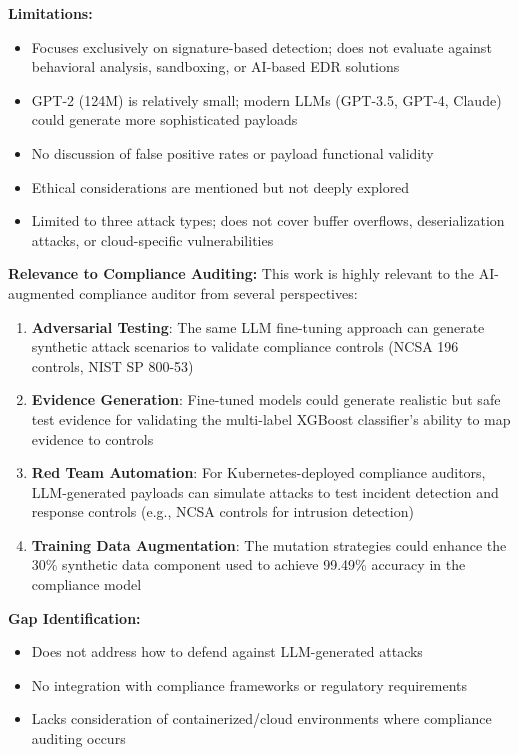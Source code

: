 \documentclass[11pt,conference]{IEEEtran}
\begin{document}
\textbf{Limitations:}
\begin{itemize}
    \item Focuses exclusively on signature-based detection; does not evaluate against behavioral analysis, sandboxing, or AI-based EDR solutions
    \item GPT-2 (124M) is relatively small; modern LLMs (GPT-3.5, GPT-4, Claude) could generate more sophisticated payloads
    \item No discussion of false positive rates or payload functional validity
    \item Ethical considerations are mentioned but not deeply explored
    \item Limited to three attack types; does not cover buffer overflows, deserialization attacks, or cloud-specific vulnerabilities
\end{itemize}

\textbf{Relevance to Compliance Auditing:}
This work is highly relevant to the AI-augmented compliance auditor from several perspectives:

\begin{enumerate}
    \item \textbf{Adversarial Testing}: The same LLM fine-tuning approach can generate synthetic attack scenarios to validate compliance controls (NCSA 196 controls, NIST SP 800-53)
    \item \textbf{Evidence Generation}: Fine-tuned models could generate realistic but safe test evidence for validating the multi-label XGBoost classifier's ability to map evidence to controls
    \item \textbf{Red Team Automation}: For Kubernetes-deployed compliance auditors, LLM-generated payloads can simulate attacks to test incident detection and response controls (e.g., NCSA controls for intrusion detection)
    \item \textbf{Training Data Augmentation}: The mutation strategies could enhance the 30\% synthetic data component used to achieve 99.49\% accuracy in the compliance model
\end{enumerate}

\textbf{Gap Identification:}
\begin{itemize}
    \item Does not address how to defend against LLM-generated attacks
    \item No integration with compliance frameworks or regulatory requirements
    \item Lacks consideration of containerized/cloud environments where compliance auditing occurs
\end{itemize}
\end{document}
